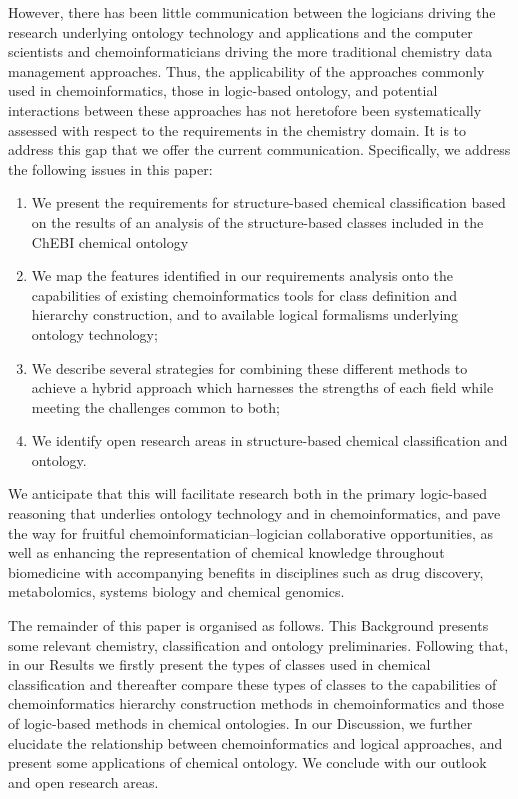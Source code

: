 \documentclass[10pt]{bmc_article}
\newenvironment{bmcformat}{\baselineskip20pt\sloppy\setboolean{publ}{false}}{\baselineskip20pt\sloppy}
\begin{document}
\begin{bmcformat}
However, there has been little communication between the logicians driving the research underlying ontology technology and applications and the computer scientists and chemoinformaticians driving the more traditional chemistry data management approaches. Thus, the applicability of the approaches commonly used in chemoinformatics, those in logic-based ontology, and potential interactions between these approaches has not heretofore been systematically assessed with respect to the requirements in the chemistry domain. It is to address this gap that we offer the current communication. Specifically, we address the following issues in this paper:
\begin{enumerate}
	\item We present the requirements for structure-based chemical classification based on the results of an analysis of the structure-based classes included in the ChEBI chemical ontology
	\item We map the features identified in our requirements analysis onto the capabilities of existing chemoinformatics tools for class definition and hierarchy construction, and to available logical formalisms underlying ontology technology;
	\item We describe several strategies for combining these different methods to achieve a hybrid approach which harnesses the strengths of each field while meeting the challenges common to both;
	\item We identify open research areas in structure-based chemical classification and ontology.
\end{enumerate}
 
We anticipate that this will facilitate research both in the primary logic-based reasoning that underlies ontology technology and in chemoinformatics, and pave the way for fruitful chemoinformatician--logician collaborative opportunities, as well as enhancing the representation of chemical knowledge throughout biomedicine with accompanying benefits in disciplines such as drug discovery, metabolomics, systems biology and chemical genomics. 

The remainder of this paper is organised as follows. This Background presents some relevant chemistry, classification and ontology preliminaries.  Following that, in our Results we firstly present the types of classes used in chemical classification and thereafter compare these types of classes to the capabilities of chemoinformatics hierarchy construction methods in chemoinformatics and those of logic-based methods in chemical ontologies. In our Discussion, we further elucidate the relationship between chemoinformatics and logical approaches, and present some applications of chemical ontology.  We conclude with our outlook and open research areas. 



\end{bmcformat}
\end{document}
